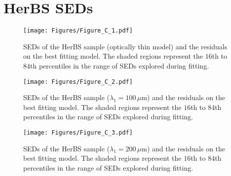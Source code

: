 \chapter{HerBS SEDs}

\begin{figure}
	\centering
	\caption[SEDs of HerBS sample (Optically thin)]{SEDs of the HerBS sample (optically thin model) and the residuals on the best fitting model. The shaded regions represent the $16$th to $84$th percentiles in the range of SEDs explored during fitting.}
	\texttt{[image: Figures/Figure\_C\_1.pdf]}
\end{figure}

\begin{figure}
	\centering
	\caption[SEDs of HerBS sample ($\lambda_1 = 100\,\mu$m)]{SEDs of the HerBS sample ($\lambda_1 = 100\,\mu$m) and the residuals on the best fitting model. The shaded regions represent the $16$th to $84$th percentiles in the range of SEDs explored during fitting.}
	\texttt{[image: Figures/Figure\_C\_2.pdf]}
\end{figure}

\begin{figure}
	\centering
	\caption[SEDs of HerBS sample ($\lambda_1 = 200\,\mu$m)]{SEDs of the HerBS sample ($\lambda_1 = 200\,\mu$m) and the residuals on the best fitting model. The shaded regions represent the $16$th to $84$th percentiles in the range of SEDs explored during fitting.}
	\texttt{[image: Figures/Figure\_C\_3.pdf]}
\end{figure}